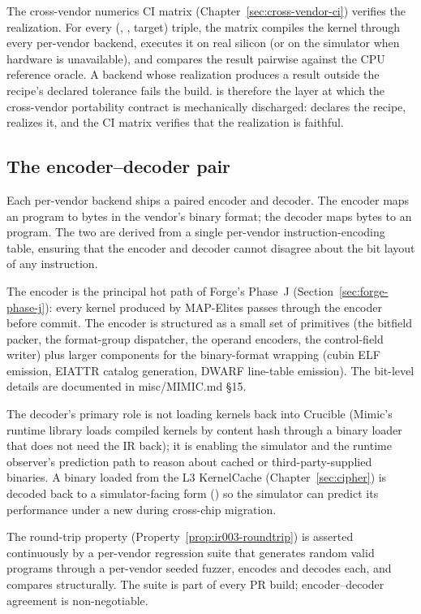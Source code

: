 The cross-vendor numerics CI matrix (Chapter~\ref{sec:cross-vendor-ci}) verifies the realization.
For every (, , target) triple, the matrix compiles the kernel through every per-vendor backend, executes it on real silicon (or on the simulator when hardware is unavailable), and compares the result pairwise against the CPU reference oracle.
A backend whose realization produces a result outside the recipe's declared tolerance fails the build.
 is therefore the layer at which the cross-vendor portability contract is mechanically discharged:  declares the recipe,  realizes it, and the CI matrix verifies that the realization is faithful.

\subsection{The encoder--decoder pair}
\label{sec:ir003-codec}

Each per-vendor backend ships a paired encoder and decoder.
The encoder maps an  program to bytes in the vendor's binary format; the decoder maps bytes to an  program.
The two are derived from a single per-vendor instruction-encoding table, ensuring that the encoder and decoder cannot disagree about the bit layout of any instruction.

The encoder is the principal hot path of Forge's Phase~J (Section~\ref{sec:forge-phase-j}): every kernel produced by MAP-Elites passes through the encoder before commit.
The encoder is structured as a small set of primitives (the bitfield packer, the format-group dispatcher, the operand encoders, the control-field writer) plus larger components for the binary-format wrapping (cubin ELF emission, EIATTR catalog generation, DWARF line-table emission).
The bit-level details are documented in misc/MIMIC.md \S15.

The decoder's primary role is not loading kernels back into Crucible (Mimic's runtime library loads compiled kernels by content hash through a binary loader that does not need the IR back); it is enabling the simulator and the runtime observer's prediction path to reason about cached or third-party-supplied binaries.
A binary loaded from the L3 KernelCache (Chapter~\ref{sec:cipher}) is decoded back to a simulator-facing form () so the simulator can predict its performance under a new  during cross-chip migration.

The round-trip property (Property~\ref{prop:ir003-roundtrip}) is asserted continuously by a per-vendor regression suite that generates random valid  programs through a per-vendor seeded fuzzer, encodes and decodes each, and compares structurally.
The suite is part of every PR build; encoder--decoder agreement is non-negotiable.

